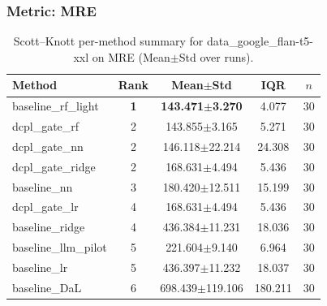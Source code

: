 \subsubsection*{Metric: MRE}
\begin{table}[H]
\centering
\scriptsize
\setlength{\tabcolsep}{4pt}
\renewcommand{\arraystretch}{1.1}
\caption{Scott--Knott per-method summary for data\_google\_flan-t5-xxl on MRE (Mean$\pm$Std over runs).}
\label{tab:sk_data_google_flan-t5-xxl_MRE}
\begin{tabular}{l|c|c|c|c}
\hline
\textbf{Method} & \textbf{Rank} & \textbf{Mean$\pm$Std} & \textbf{IQR} & \textbf{$n$} \\
\hline
\rowcolor{red!15} baseline\_rf\_light & \textbf{1} & \textbf{143.471$\pm$3.270} & 4.077 & 30 \\
dcpl\_gate\_rf & 2 & 143.855$\pm$3.165 & 5.271 & 30 \\
dcpl\_gate\_nn & 2 & 146.118$\pm$22.214 & 24.308 & 30 \\
dcpl\_gate\_ridge & 2 & 168.631$\pm$4.494 & 5.436 & 30 \\
baseline\_nn & 3 & 180.420$\pm$12.511 & 15.199 & 30 \\
dcpl\_gate\_lr & 4 & 168.631$\pm$4.494 & 5.436 & 30 \\
baseline\_ridge & 4 & 436.384$\pm$11.231 & 18.036 & 30 \\
baseline\_llm\_pilot & 5 & 221.604$\pm$9.140 & 6.964 & 30 \\
baseline\_lr & 5 & 436.397$\pm$11.232 & 18.037 & 30 \\
baseline\_DaL & 6 & 698.439$\pm$119.106 & 180.211 & 30 \\
\hline
\end{tabular}
\end{table}

